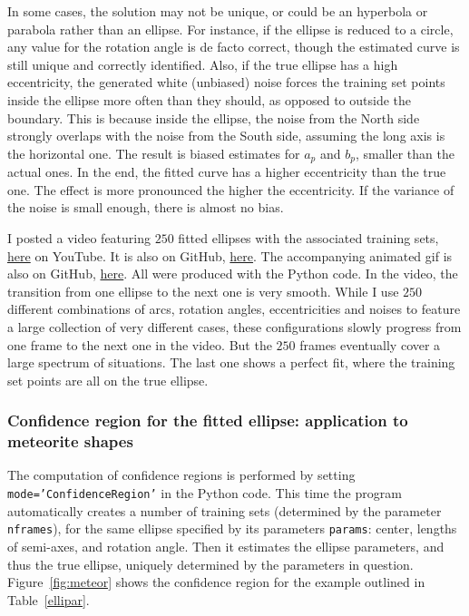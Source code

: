 \documentclass[oneside,10pt]{book}
\begin{document}
In some cases, the solution may not be unique, or could be an hyperbola or parabola rather than an ellipse. For instance, if the ellipse is reduced to a circle, any value for the rotation angle is de facto correct, though the estimated curve is still unique and correctly identified. Also, if the true ellipse has a high eccentricity, the generated white (unbiased) noise 
 forces the training set points inside the ellipse more often than they should, as opposed to outside the boundary. This is because inside the ellipse, the noise from the North side strongly overlaps with the noise from the South side, assuming the long axis is the horizontal one. The result is biased estimates for $a_p$ and $b_p$, smaller than the actual ones. In the end, the fitted curve has a higher eccentricity than the true one. The effect is more pronounced the higher the eccentricity. If the variance of the noise is small enough, there is almost no bias.  

I posted a video featuring $250$ fitted ellipses with the associated training sets, \href{https://youtu.be/ReyA9NWyjso}{here}  on YouTube. 
It is also on GitHub, \href{https://github.com/VincentGranville/Machine-Learning/blob/main/Images/ellipseFitting300dpi.mp4}{here}. The accompanying animated gif is also on GitHub, \href{https://github.com/VincentGranville/Machine-Learning/blob/main/Images/ellipse100dpi.gif}{here}. All were produced with the Python code. In the video, the transition from one ellipse to the next one is very smooth. While I use $250$ different combinations of arcs, rotation angles, eccentricities and noises to feature a large collection of very different cases, these configurations slowly progress from one frame to the next one in the video. But the $250$ frames eventually cover a large spectrum of situations. The last one shows a perfect fit, where the training set points are all on the true ellipse.


\subsubsection{Confidence region for the fitted ellipse: application to meteorite shapes}\label{rt543erzxswa}

The computation of \textcolor{index}{confidence regions} is performed by setting \texttt{mode='ConfidenceRegion'} in the Python code. This time the program automatically creates a number of training sets (determined by the parameter \texttt{nframes}), for the same ellipse  
specified by its parameters \texttt{params}: center, lengths of semi-axes, and rotation angle. 
 Then it estimates the ellipse parameters, and thus the true ellipse, uniquely determined by the parameters in question. Figure~\ref{fig:meteor} shows the confidence region for the example outlined in Table~\ref{ellipar}.
\end{document}
